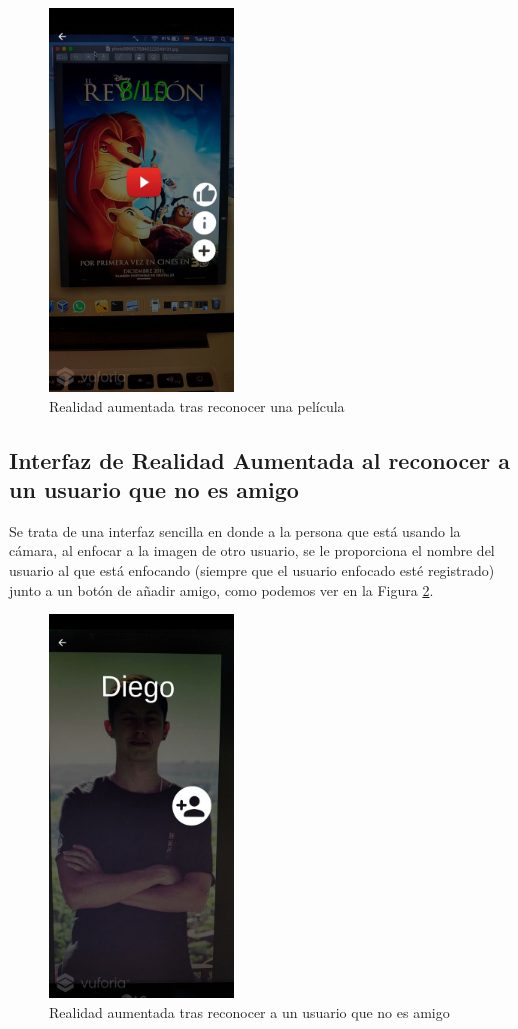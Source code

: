 \begin{figure}[H]
    \centering
    \includegraphics[height=4in]{figures/chapter-3/film-recognized.jpg}
    \caption{Realidad aumentada tras reconocer una película}
    \label{fig:ra_pelicula}
\end{figure}

\subsection{Interfaz de Realidad Aumentada al reconocer a un usuario que no es amigo}
\label{makereference3.4.5.1}
Se trata de una interfaz sencilla en donde a la persona que está usando la cámara, al enfocar a la imagen de otro usuario, se le proporciona el nombre del usuario al
 que está enfocando (siempre que el usuario enfocado esté registrado) junto a un botón de añadir amigo, como podemos ver en la Figura \ref{fig:ra_usuario}.
\begin{figure}[H]
    \centering
    \includegraphics[height=4in]{figures/chapter-3/usernotFriendrecognized.jpg}
    \caption{Realidad aumentada tras reconocer a un usuario que no es amigo}
    \label{fig:ra_usuario}
\end{figure}

